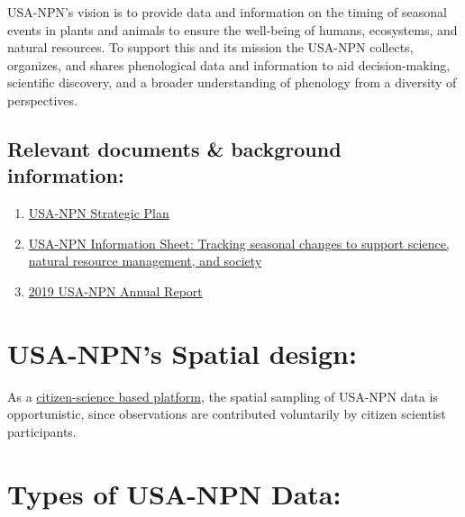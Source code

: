 \documentclass[]{book}
\begin{document}
USA-NPN's vision is to provide data and information on the timing of seasonal events in plants and animals to ensure the well-being of humans, ecosystems, and natural resources. To support this and its mission the USA-NPN collects, organizes, and shares phenological data and information to aid decision-making, scientific discovery, and a broader understanding of phenology from a diversity of perspectives.

\hypertarget{relevant-documents-background-information}{%
\subsection{Relevant documents \& background information:}\label{relevant-documents-background-information}}

\begin{enumerate}
\def\labelenumi{\arabic{enumi}.}
\item
  \href{https://usanpn.org/files/npn/reports/USA-NPN_StrategicPlan_2019-2024.pdf}{USA-NPN Strategic Plan}
\item
  \href{https://usanpn.org/files/npn/reports/USA-NPN_InfoSheet_2020.pdf}{USA-NPN Information Sheet: Tracking seasonal changes to support science, natural resource management, and society}
\item
  \href{https://www.usanpn.org/files/npn/reports/USA-NPN_AnnualReport2019.pdf}{2019 USA-NPN Annual Report}
\end{enumerate}

\hypertarget{usa-npns-spatial-design}{%
\section{USA-NPN's Spatial design:}\label{usa-npns-spatial-design}}

As a \href{https://www.youtube.com/watch?v=WR34LGvuFac}{citizen-science based platform}, the spatial sampling of USA-NPN data is opportunistic, since observations are contributed voluntarily by citizen scientist participants.

\hypertarget{types-of-usa-npn-data}{%
\section{Types of USA-NPN Data:}\label{types-of-usa-npn-data}}
\end{document}
